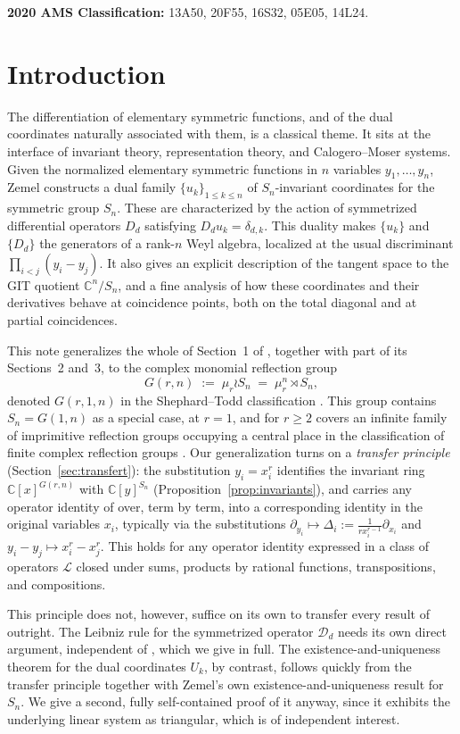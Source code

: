 \documentclass[11pt]{article}
\theoremstyle{remark}
\newcommand{\CC}{\mathbb{C}}
\begin{document}
\noindent\textbf{2020 AMS Classification:} 13A50, 20F55, 16S32, 05E05, 14L24.

\section{Introduction}\label{sec:intro}

The differentiation of elementary symmetric functions, and of the dual coordinates naturally associated with them, is a classical theme. It sits at the interface of invariant theory, representation theory, and Calogero--Moser systems. Given the normalized elementary symmetric functions in $n$ variables $y_1,\dots,y_n$, Zemel \cite{Ze} constructs a dual family $\{u_k\}_{1\le k\le n}$ of $S_n$-invariant coordinates for the symmetric group $S_n$. These are characterized by the action of symmetrized differential operators $D_d$ satisfying $D_du_k=\delta_{d,k}$. This duality makes $\{u_k\}$ and $\{D_d\}$ the generators of a rank-$n$ Weyl algebra, localized at the usual discriminant $\prod_{i<j}(y_i-y_j)$. It also gives an explicit description of the tangent space to the GIT quotient $\CC^n/S_n$, and a fine analysis of how these coordinates and their derivatives behave at coincidence points, both on the total diagonal and at partial coincidences.

This note generalizes the whole of Section~1 of \cite{Ze}, together with part of its Sections~2 and~3, to the complex monomial reflection group
\[
G(r,n) \;:=\; \mu_r\wr S_n \;=\; \mu_r^n\rtimes S_n,
\]
denoted $G(r,1,n)$ in the Shephard--Todd classification \cite{ST}. This group contains $S_n=G(1,n)$ as a special case, at $r=1$, and for $r\ge2$ covers an infinite family of imprimitive reflection groups occupying a central place in the classification of finite complex reflection groups \cite{ST,Ch}. Our generalization turns on a \emph{transfer principle} (Section~\ref{sec:transfert}): the substitution $y_i=x_i^r$ identifies the invariant ring $\CC[x]^{G(r,n)}$ with $\CC[y]^{S_n}$ (Proposition~\ref{prop:invariants}), and carries any operator identity of \cite{Ze} over, term by term, into a corresponding identity in the original variables $x_i$, typically via the substitutions $\partial_{y_i}\mapsto\Delta_i:=\frac{1}{rx_i^{r-1}}\partial_{x_i}$ and $y_i-y_j\mapsto x_i^r-x_j^r$. This holds for any operator identity expressed in a class of operators $\mathcal L$ closed under sums, products by rational functions, transpositions, and compositions.

This principle does not, however, suffice on its own to transfer every result of \cite{Ze} outright. The Leibniz rule for the symmetrized operator $\mathcal D_d$ needs its own direct argument, independent of \cite{Ze}, which we give in full. The existence-and-uniqueness theorem for the dual coordinates $U_k$, by contrast, follows quickly from the transfer principle together with Zemel's own existence-and-uniqueness result for $S_n$. We give a second, fully self-contained proof of it anyway, since it exhibits the underlying linear system as triangular, which is of independent interest.
\end{document}

